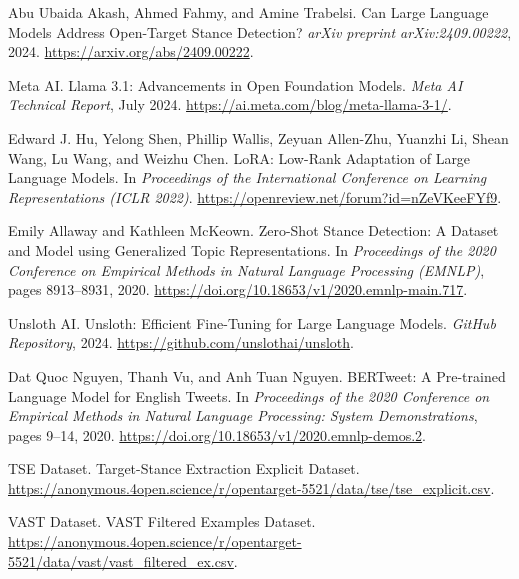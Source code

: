 \documentclass[twocolumn,11pt,letterpaper]{article}
\begin{document}
\begin{thebibliography}{99}

Abu Ubaida Akash, Ahmed Fahmy, and Amine Trabelsi.
\newblock Can Large Language Models Address Open-Target Stance Detection?
\newblock \emph{arXiv preprint arXiv:2409.00222}, 2024.
\newblock \url{https://arxiv.org/abs/2409.00222}.

Meta AI.
\newblock Llama 3.1: Advancements in Open Foundation Models.
\newblock \emph{Meta AI Technical Report}, July 2024.
\newblock \url{https://ai.meta.com/blog/meta-llama-3-1/}.

Edward J. Hu, Yelong Shen, Phillip Wallis, Zeyuan Allen-Zhu, Yuanzhi Li, Shean Wang, Lu Wang, and Weizhu Chen.
\newblock LoRA: Low-Rank Adaptation of Large Language Models.
\newblock In \emph{Proceedings of the International Conference on Learning Representations (ICLR 2022)}.
\newblock \url{https://openreview.net/forum?id=nZeVKeeFYf9}.

Emily Allaway and Kathleen McKeown.
\newblock Zero-Shot Stance Detection: A Dataset and Model using Generalized Topic Representations.
\newblock In \emph{Proceedings of the 2020 Conference on Empirical Methods in Natural Language Processing (EMNLP)}, pages 8913--8931, 2020.
\newblock \url{https://doi.org/10.18653/v1/2020.emnlp-main.717}.

Unsloth AI.
\newblock Unsloth: Efficient Fine-Tuning for Large Language Models.
\newblock \emph{GitHub Repository}, 2024.
\newblock \url{https://github.com/unslothai/unsloth}.

Dat Quoc Nguyen, Thanh Vu, and Anh Tuan Nguyen.
\newblock BERTweet: A Pre-trained Language Model for English Tweets.
\newblock In \emph{Proceedings of the 2020 Conference on Empirical Methods in Natural Language Processing: System Demonstrations}, pages 9--14, 2020.
\newblock \url{https://doi.org/10.18653/v1/2020.emnlp-demos.2}.

TSE Dataset.
\newblock Target-Stance Extraction Explicit Dataset.
\newblock \url{https://anonymous.4open.science/r/opentarget-5521/data/tse/tse_explicit.csv}.

VAST Dataset.
\newblock VAST Filtered Examples Dataset.
\newblock \url{https://anonymous.4open.science/r/opentarget-5521/data/vast/vast_filtered_ex.csv}.

\end{thebibliography}
\end{document}
